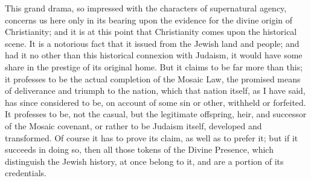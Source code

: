 This grand drama, so impressed with the characters of supernatural
agency, concerns us here only in its bearing upon the evidence for the
divine origin of Christianity; and it is at this point that
Christianity comes upon the historical scene. It is a notorious fact
that it issued from the Jewish land and people; and had it no other
than this historical connexion with Judaism, it would have some share
in the prestige of its original home. But it claims to be far more
than this; it professes to be the actual completion of the Mosaic Law,
the promised means of deliverance and triumph to the nation, which
that nation itself, as I have said, has since considered to be, on
account of some sin or other, withheld or forfeited. It professes to
be, not the casual, but the legitimate offspring, heir, and successor
of the Mosaic covenant, or rather to be Judaism itself, developed and
transformed. Of course it has to prove its claim, as well as to prefer
it; but if it succeeds in doing so, then all those tokens of the
Divine Presence, which distinguish the Jewish history, at once belong
to it, and are a portion of its credentials.

